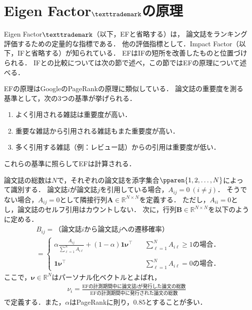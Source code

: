 
\section{Eigen Factor$\texttrademark$の原理}
Eigen Factor$\texttrademark$（以下，EFと省略する）は，
論文誌をランキング評価するための定量的な指標である．
他の評価指標として．Impact Factor（以下，IFと省略する）が知られている．
EFはIFの短所を改善したものと位置づけられる．
IFとの比較については次の節で述べ，この節ではEFの原理について述べる．
\par
EFの原理はGoogleのPageRankの原理に類似している．
論文誌の重要度を測る基準として，次の3つの基準が挙げられる．
\begin{enumerate}
    \item よく引用される雑誌は重要度が高い．
    \item 重要な雑誌から引用される雑誌もまた重要度が高い．
    \item 多く引用する雑誌（例：レビュー誌）からの引用は重要度が低い．
\end{enumerate}
これらの基準に照らしてEFは計算される．
\par
論文誌の総数は$N$で，それぞれの論文誌を添字集合$\pparen{1,2,\ldots,N}$によって識別する．
論文誌$i$が論文誌$j$を引用している場合，$A_{ij}=0~(i\neq j)$．
そうでない場合，$A_{ij}=0$として隣接行列$\bm{A} \in \mathbb{R}^{N \times N}$を定義する．
ただし，$A_{ii}=0$とし，論文誌のセルフ引用はカウントしない．
次に，行列$\bm{B} \in \mathbb{R}^{N \times N}$を以下のように定める．
\begin{align*}
    & B_{ij} = \text{（論文誌$i$から論文誌$j$への遷移確率）} \\
    & =\begin{cases}
        \alpha \frac{A_{ij}}{\sum_{\ell=1}^N A_{i\ell}} + (1-\alpha) \bm{1}\bm{\nu}^{\top}
        &\quad \sum_{\ell=1}^N A_{i\ell} \geq 1\text{の場合．} \\
        \\
        \bm{1}\bm{\nu}^{\top}
        &\quad \sum_{\ell=1}^N A_{i\ell} =0\text{の場合．} 
    \end{cases}
\end{align*}
ここで，$\bm{\nu} \in \mathbb{R}^N$はパーソナル化ベクトルとよばれ，
\begin{align*}
    \nu_i 
    = \frac{\text{EFの計測期間中に論文誌$i$が発行した論文の総数}}{\text{EFの計測期間中に発行された論文の総数}}
\end{align*}
で定義する．また，$\alpha$はPageRankに則り，$0.85$とすることが多い．

